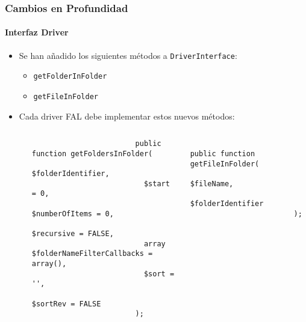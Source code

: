 \begin{frame}[fragile]
	\frametitle{Cambios en Profundidad}
	\framesubtitle{Interfaz Driver}

	\lstset{basicstyle=\tiny\ttfamily}

	\begin{itemize}

		\item Se han añadido los siguientes métodos a \texttt{DriverInterface}:

			\begin{itemize}
				\item \texttt{getFolderInFolder}
				\item \texttt{getFileInFolder}
			\end{itemize}

		\item Cada driver FAL debe implementar estos nuevos métodos:

			\begin{columns}[T]
				\begin{column}{.07\textwidth}
                \end{column}
				\begin{column}{.465\textwidth}

					\begin{lstlisting}
						public function getFoldersInFolder(
						  $folderIdentifier,
						  $start = 0,
						  $numberOfItems = 0,
						  $recursive = FALSE,
						  array $folderNameFilterCallbacks = array(),
						  $sort = '',
						  $sortRev = FALSE
						);
					\end{lstlisting}

                \end{column}
				\begin{column}{.465\textwidth}

					\begin{lstlisting}
						public function getFileInFolder(
						  $fileName,
						  $folderIdentifier
						);
					\end{lstlisting}

				\end{column}
			\end{columns}

	\end{itemize}

	\breakingchange

\end{frame}


